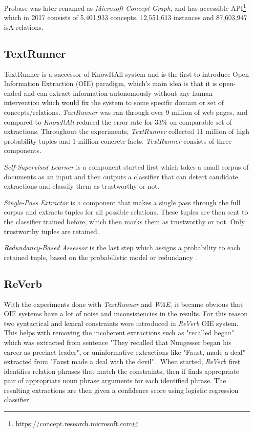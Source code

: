 Probase was later renamed as \emph{Microsoft Concept Graph}, and has accessible
API\footnote{https://concept.research.microsoft.com} which in 2017 consists of
5,401,933 concepts, 12,551,613 instances and 87,603,947 isA relations. 

\subsection {TextRunner}
\label{section:r:textrunner}
TextRunner is a successor of KnowItAll system \parencite{Soderland2007} and is
the first to introduce Open Information Extraction (OIE) paradigm, which's main
idea is that it is open-ended and can extract information autonomously without
any human intervention which would fix the system to some specific domain or set
of concepts/relations.
\emph{TextRunner} was ran through over 9 million of web pages, and compared to
\emph{KnowItAll} reduced the error rate for 33\% on comparable set of 
extractions. Throughout the experiments, \emph{TextRunner} collected 11 million
of high probability tuples and 1 million concrete facts. \emph{TextRunner} 
consists of three components.

\emph{Self-Supervised Learner} is a component started first which takes a small
corpus of documents as an input and then outputs a classifier that can detect
candidate extractions and classify them as trustworthy or not.

\emph{Single-Pass Extractor} is a component that makes a single pass through
the full corpus and extracts tuples for all possible relations. These tuples
are then sent to the classifier trained before, which then marks them as
trustworthy or not. Only trustworthy tuples are retained.

\emph{Redundancy-Based Assessor} is the last step which assigns a probability to
each retained tuple, based on the probabilistic model or redundancy
\parencite{Downey2005}.

\subsection{ReVerb}
\label{section:r:reverb}
With  the experiments done with \emph{TextRunner} and \emph{WAE}, it became
obvious that OIE systems have a lot of noise and inconsistencies in the results.
For this reason two syntactical and lexical constraints were introduced in
\emph{ReVerb} OIE system\parencite{Fader2011}. This helps with removing
the incoherent extractions such as "recalled began" which was extracted from
sentence "They recalled that Nungesser began his career as precinct leader", or
uninformative extractions like "Faust, made a deal" extracted from "Faust
made a deal with the devil".\parencite{Fader2011}.
When started, \emph{ReVerb} first identifies relation phrases that match the
constraints, then if finds appropriate pair of appropriate noun phrase arguments
for each identified phrase. The resulting extractions are then given a 
confidence score using logistic regression classifier.

